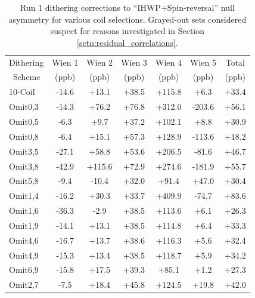 \begin{table}[!h]
\caption{Run 1 dithering corrections to ``IHWP+Spin-reversal'' null asymmetry for various coil selections. Grayed-out sets considered suspect  for reasons investigated in Section \ref{sctn:residual_correlations}.}
\begin{center}
\begin{tabular}[h]{|l||c|c|c|c|c||c|}\hline
Dithering& Wien 1& Wien 2& Wien 3& Wien 4& Wien 5& Total\\
~Scheme&(ppb)&(ppb)&(ppb)&(ppb)&(ppb)&(ppb)\\\hline\hline
10-Coil& -14.6& +13.1& +38.5& +115.8& +6.3& +33.4\\\hline
{\color{Gray}Omit0,3}&{\color{Gray} -14.3}&{\color{Gray} +76.2}&{\color{Gray} +76.8}&{\color{Gray} +312.0}&{\color{Gray} -203.6}&{\color{Gray} +56.1}\\\hline
Omit0,5& -6.3& +9.7& +37.2& +102.1& +8.8& +30.9\\\hline
{\color{Gray}Omit0,8}&{\color{Gray} -6.4}&{\color{Gray} +15.1}&{\color{Gray} +57.3}&{\color{Gray} +128.9}&{\color{Gray} -113.6}&{\color{Gray} +18.2}\\\hline
{\color{Gray}Omit3,5}&{\color{Gray} -27.1}&{\color{Gray} +58.8}&{\color{Gray} +53.6}&{\color{Gray} +206.5}&{\color{Gray} -81.6}&{\color{Gray} +46.7}\\\hline
{\color{Gray}Omit3,8}&{\color{Gray} -42.9}&{\color{Gray} +115.6}&{\color{Gray} +72.9}&{\color{Gray} +274.6}&{\color{Gray} -181.9}&{\color{Gray} +55.7}\\\hline
{\color{Gray}Omit5,8}&{\color{Gray} -9.4}&{\color{Gray} -10.4}&{\color{Gray} +32.0}&{\color{Gray} +91.4}&{\color{Gray} +47.0}&{\color{Gray} +30.4}\\\hline
{\color{Gray}Omit1,4}&{\color{Gray} -16.2}&{\color{Gray} +30.3}&{\color{Gray} +33.7}&{\color{Gray} +409.9}&{\color{Gray} -74.7}&{\color{Gray} +83.6}\\\hline
Omit1,6& -36.3& -2.9& +38.5& +113.6& +6.1& +26.3\\\hline
Omit1,9& -14.1& +13.1& +38.5& +114.8& +6.4& +33.3\\\hline
Omit4,6& -16.7& +13.7& +38.6& +116.3& +5.6& +32.4\\\hline
Omit4,9& -15.3& +13.4& +38.5& +118.7& +5.9& +34.2\\\hline
Omit6,9& -15.8& +17.5& +39.3& +85.1& +1.2& +27.3\\\hline
Omit2,7& -7.5& +18.4& +45.8& +124.5& +19.8& +42.0\\\hline

\end{tabular}
\end{center}
\end{table}
